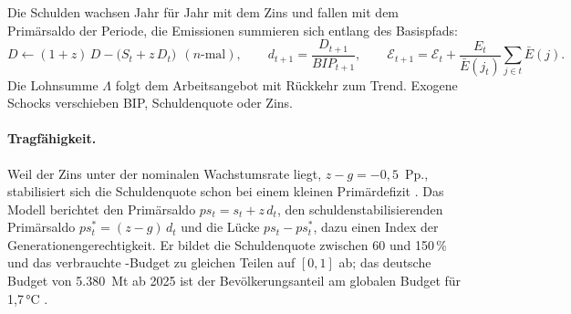 Die Schulden wachsen Jahr für Jahr mit dem Zins und fallen mit dem
Primärsaldo der Periode, die Emissionen summieren sich entlang des
Basispfads:
\begin{equation}
  D \leftarrow (1+z)\,D - \bigl(S_t + z\,D_t\bigr)\ \ (n\text{-mal}),
  \qquad d_{t+1} = \frac{D_{t+1}}{\mathit{BIP}_{t+1}},
  \qquad \mathcal E_{t+1} = \mathcal E_t + \frac{E_t}{\bar E(j_t)}\sum_{j\in t}\bar E(j).
\end{equation}
Die Lohnsumme $\Lambda$ folgt dem Arbeitsangebot mit Rückkehr zum Trend.
Exogene Schocks verschieben BIP, Schuldenquote oder Zins.

\paragraph{Tragfähigkeit.} Weil der Zins unter der nominalen Wachstumsrate
liegt, $z - g = -0{,}5$~Pp., stabilisiert sich die Schuldenquote schon bei
einem kleinen Primärdefizit \parencite{domar1944,blanchard2019}. Das Modell
berichtet den Primärsaldo $ps_t = s_t + z\,d_t$, den
schuldenstabilisierenden Primärsaldo $ps^{*}_t = (z - g)\,d_t$ und die Lücke
$ps_t - ps^{*}_t$, dazu einen Index der Generationengerechtigkeit. Er bildet
die Schuldenquote zwischen 60 und 150\,\% und das verbrauchte \COz-Budget zu
gleichen Teilen auf $[0,1]$ ab; das deutsche Budget von 5.380~Mt ab 2025 ist
der Bevölkerungsanteil am globalen Budget für 1,7\,°C \parencite{forster2026}.
